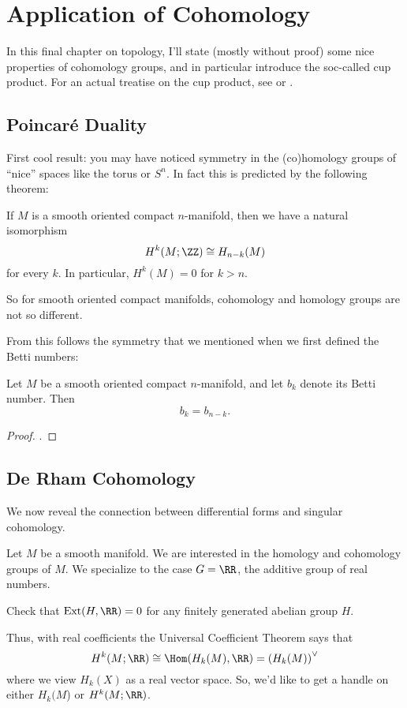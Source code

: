 \chapter{Application of Cohomology}
In this final chapter on topology, I'll state (mostly without proof)
some nice properties of cohomology groups, and in particular
introduce the soc-called cup product.
For an actual treatise on the cup product,
see \cite{ref:hatcher} or \cite{ref:maxim752}.

\section{Poincar\'e Duality}
First cool result:
you may have noticed symmetry in the (co)homology groups of
``nice'' spaces like the torus or $S^n$.
In fact this is predicted by the following theorem:
\begin{theorem}
	If $M$ is a smooth oriented compact $n$-manifold,
	then we have a natural isomorphism
	\[ H^k(M; \ZZ) \cong H_{n-k}(M) \]
	for every $k$.
	In particular, $H^k(M) = 0$ for $k > n$.
\end{theorem}
So for smooth oriented compact manifolds,
cohomology and homology groups are not so different.

From this follows the symmetry that we mentioned
when we first defined the Betti numbers:
\begin{corollary}
	Let $M$ be a smooth oriented compact $n$-manifold,
	and let $b_k$ denote its Betti number.
	Then \[ b_k = b_{n-k}. \]
\end{corollary}
\begin{proof}
	.
\end{proof}


\section{De Rham Cohomology}
We now reveal the connection between
differential forms and singular cohomology.

Let $M$ be a smooth manifold.
We are interested in the homology and cohomology groups of $M$.
We specialize to the case $G = \RR$, the additive group of real numbers.
\begin{ques}
	Check that $\Ext(H, \RR) = 0$ for any finitely generated abelian group $H$.
\end{ques}
Thus, with real coefficients the Universal Coefficient Theorem says that
\[ H^k(M; \RR) \cong \Hom(H_k(M), \RR) = \left( H_k(M) \right)^\vee \]
where we view $H_k(X)$ as a real vector space.
So, we'd like to get a handle on either $H_k(M$) or $H^k(M; \RR)$.

